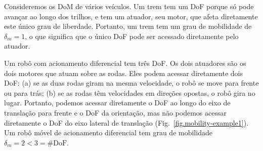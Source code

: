 Consideremos os DoM de vários veículos. Um trem tem um DoF porque só pode avançar ao longo dos trilhos, e tem um atuador, seu motor, que afeta diretamente este único grau de liberdade. Portanto, um trem tem um grau de mobilidade de $\delta_m = 1$, o que significa que o único DoF pode ser acessado diretamente pelo atuador.

Um robô com acionamento diferencial tem três DoF. Os dois atuadores são os dois motores que atuam sobre as rodas. Eles podem acessar diretamente dois DoF: (a) se as duas rodas giram na mesma velocidade, o robô se move para frente ou para trás; (b) se as rodas têm velocidades em direções opostas, o robô gira no lugar. Portanto, podemos acessar diretamente o DoF ao longo do eixo de translação para frente e o DoF da orientação, mas não podemos acessar diretamente o DoF do eixo lateral de translação (Fig.~\ref{fig.mobility-example1}). Um robô móvel de acionamento diferencial tem grau de mobilidade $\delta_m = 2 < 3 = \#\textrm{DoF}$.

